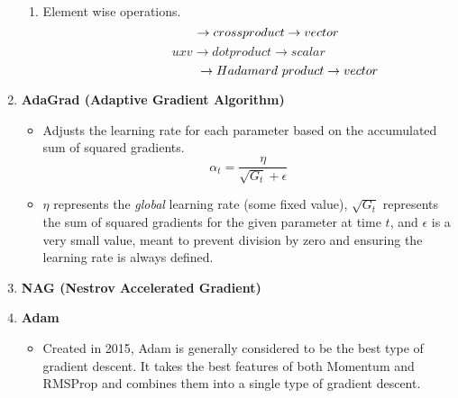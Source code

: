 \begin{enumerate}
\begin{enumerate}
        \item Element wise operations.
        \[
        \hspace{1.1cm} \rightarrow cross product \rightarrow vector
        \]
        \[
        uxv \rightarrow dot product \rightarrow scalar
        \]
        \[
        \hspace{2.3cm} \rightarrow Hadamard\ product \rightarrow vector
        \]
    \end{enumerate}
    \item \textbf{AdaGrad (Adaptive Gradient Algorithm)}
    \begin{itemize}
        \item Adjusts the learning rate for each parameter based on the accumulated sum of squared gradients.
        \[
        \alpha_t = \frac{\eta}{\sqrt{G_t}+\epsilon}
        \]
        \item $\eta$ represents the \textit{global} learning rate (some fixed value), $\sqrt{G_t}$ represents the sum of squared gradients for the given parameter at time $t$, and $\epsilon$ is a very small value, meant to prevent division by zero and ensuring the learning rate is always defined.
    \end{itemize}
    \item \textbf{NAG (Nestrov Accelerated Gradient)}
    \item \textbf{Adam}
    \begin{itemize}
        \item Created in 2015, Adam is generally considered to be the best type of gradient descent. It takes the best features of both Momentum and RMSProp and combines them into a single type of gradient descent.
    \end{itemize}
\end{enumerate}
